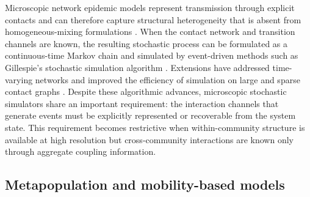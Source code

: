 \documentclass[a4paper,fleqn]{cas-sc}
\begin{document}
Microscopic network epidemic models represent transmission through explicit contacts and can therefore capture structural heterogeneity that is absent from homogeneous-mixing formulations \cite{keeling2005,pastorsatorras2015}. When the contact network and transition channels are known, the resulting stochastic process can be formulated as a continuous-time Markov chain and simulated by event-driven methods such as Gillespie’s stochastic simulation algorithm \cite{gillespie1977exact}. Extensions have addressed time-varying networks and improved the efficiency of simulation on large and sparse contact graphs \cite{vestergaard2015,kuryliak2025simulating}. Despite these algorithmic advances, microscopic stochastic simulators share an important requirement: the interaction channels that generate events must be explicitly represented or recoverable from the system state. This requirement becomes restrictive when within-community structure is available at high resolution but cross-community interactions are known only through aggregate coupling information.
\subsection{Metapopulation and mobility-based models}

\end{document}
